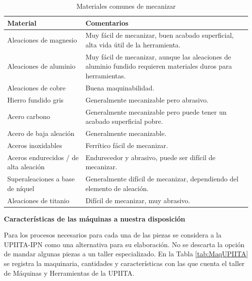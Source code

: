 \begin{table}[H]
  \centering
  \caption{Materiales comunes de mecanizar\cite{ProcessP}}
    \begin{tabular}{|p{16.145em}|p{18em}|}
    \hline
    \textbf{Material} & \textbf{Comentarios} \\
    \hline \hline
    Aleaciones de magnesio & Muy fácil de mecanizar, buen acabado superficial, alta vida útil de la herramienta. \\
    \hline
    Aleaciones de aluminio & Muy fácil de mecanizar, aunque las aleaciones de aluminio fundido requieren materiales duros para herramientas. \\
    \hline
    Aleaciones de cobre & Buena maquinabilidad. \\
    \hline
    Hierro fundido gris & Generalmente mecanizable pero abrasivo. \\
    \hline
    Acero carbono & Generalmente mecanizable pero puede tener un acabado superficial pobre. \\
    \hline
    Acero de baja aleación & Generalmente mecanizable. \\
    \hline
    Aceros inoxidables & Ferrítico fácil de mecanizar. \\
    \hline
    Aceros endurecidos / de alta aleación & Endurecedor y abrasivo, puede ser difícil de mecanizar. \\
    \hline
    Superaleaciones a base de níquel & Generalmente difícil de mecanizar, dependiendo del elemento de aleación. \\
    \hline
    Aleaciones de titanio & Difícil de mecanizar, muy abrasivo. \\
    \hline
    \end{tabular}%
  \label{tab:MaterialesM}%
\end{table}%

\textbf{Características de las máquinas a nuestra disposición}

Para los procesos necesarios para cada una de las piezas se considera a la UPIITA-IPN como una alternativa para su elaboración. No se descarta la opción de mandar algunas piezas a un taller especializado. En la Tabla \ref{tab:MaqUPIITA} se registra la maquinaria, cantidades y características con las que cuenta el taller de Máquinas y Herramientas de la UPIITA.

